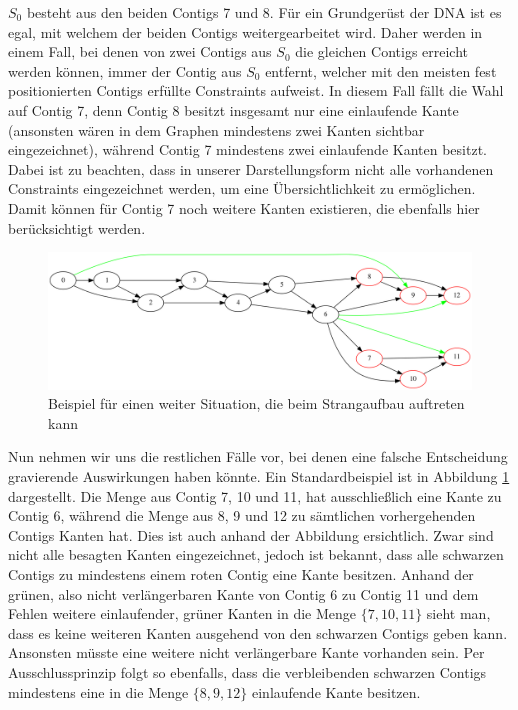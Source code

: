 $S_0$ besteht aus den beiden Contigs 7 und 8. Für ein Grundgerüst der DNA ist es egal, mit welchem der beiden Contigs weitergearbeitet wird. Daher werden in einem Fall, bei denen von zwei Contigs aus $S_0$ die gleichen Contigs erreicht werden können, immer der Contig aus $S_0$ entfernt, welcher mit den meisten fest positionierten Contigs erfüllte Constraints aufweist. 
In diesem Fall fällt die Wahl auf Contig 7, denn Contig 8 besitzt insgesamt nur eine einlaufende Kante (ansonsten wären in dem Graphen mindestens zwei Kanten sichtbar eingezeichnet), während Contig 7 mindestens zwei einlaufende Kanten besitzt. Dabei ist zu beachten, dass in unserer Darstellungsform nicht alle vorhandenen Constraints eingezeichnet werden, um eine Übersichtlichkeit zu ermöglichen. Damit können für Contig 7 noch weitere Kanten existieren, die ebenfalls hier berücksichtigt werden. 


\begin{figure}
	\begin{center}
		\includegraphics[width=1\textwidth]{bilder/bigsplit}
	\end{center}
	\caption{Beispiel für einen weiter Situation, die beim Strangaufbau auftreten kann}
	\label{bigsplit}
\end{figure}
Nun nehmen wir uns die restlichen Fälle vor, bei denen eine falsche Entscheidung gravierende Auswirkungen haben könnte. Ein Standardbeispiel ist in Abbildung \ref{bigsplit} dargestellt. 
Die Menge aus Contig 7, 10 und 11, hat ausschließlich eine Kante zu Contig 6, während die Menge aus 8, 9 und 12 zu sämtlichen vorhergehenden Contigs Kanten hat.
Dies ist auch anhand der Abbildung ersichtlich. Zwar sind nicht alle besagten Kanten eingezeichnet, jedoch ist bekannt, dass alle schwarzen Contigs zu mindestens einem roten Contig eine Kante besitzen. Anhand der grünen, also nicht verlängerbaren Kante von Contig 6 zu Contig 11 und dem Fehlen weitere einlaufender, grüner Kanten in die Menge $\{ 7, 10, 11 \}$ sieht man, dass es keine weiteren Kanten ausgehend von den schwarzen Contigs geben kann. Ansonsten müsste eine weitere nicht verlängerbare Kante vorhanden sein.
Per Ausschlussprinzip folgt so ebenfalls, dass die verbleibenden schwarzen Contigs mindestens eine in die Menge $\{8,9,12\}$ einlaufende Kante besitzen.

